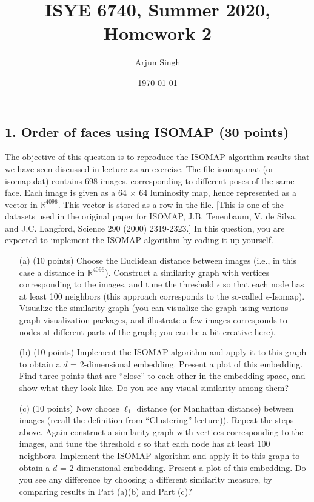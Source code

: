 \documentclass[twoside,12pt]{article}
\begin{document}
\title{ISYE 6740, Summer 2020, Homework 2}
\author{Arjun Singh}
\date{\today}
\maketitle



\subsection*{1. Order of faces using ISOMAP (30 points)}

The objective of this question is to reproduce the ISOMAP algorithm results that we have seen discussed in lecture as an exercise. The file \textsf{isomap.mat} (or \textsf{isomap.dat}) contains 698 images, corresponding to different poses of the same face. Each image is given as a 64 $\times$ 64 luminosity map, hence represented as a vector in $\mathbb R^{4096}$. This vector is stored as a row in the file. [This is one of the datasets used in the original paper for ISOMAP, J.B. Tenenbaum, V. de Silva, and J.C. Langford, Science 290 (2000) 2319-2323.] In this question, you are expected to implement the ISOMAP algorithm by coding it up yourself.

\begin{enumerate} 
\item[(a)] (10 points) Choose the Euclidean distance between images (i.e., in this case a distance in $\mathbb R^{4096}$). Construct a similarity graph with vertices corresponding to the images, and tune the threshold $\epsilon$ so that each node has at least 100 neighbors (this approach corresponds to the so-called $\epsilon$-Isomap). Visualize the similarity graph (you can visualize the graph  using various graph visualization packages, and illustrate a few images corresponds to nodes at different parts of the graph; you can be a bit creative here).
 
\item[(b)] (10 points) Implement the ISOMAP algorithm and apply it to this graph to obtain a $d$ = 2-dimensional embedding. Present a plot of this embedding. Find three points that are ``close'' to each other in the embedding space, and show what they look like. Do you see any visual similarity among them?

\item[(c)] (10 points) Now choose $\ell_1$ distance (or Manhattan distance) between images (recall the definition from ``Clustering'' lecture)). Repeat the steps above. Again construct a similarity graph with vertices corresponding to the images, and tune the threshold $\epsilon$ so that each node has at least 100 neighbors. Implement the ISOMAP algorithm and apply it to this graph to obtain a $d$ = 2-dimensional embedding. Present a plot of this embedding.  Do you see any difference by choosing a different similarity measure, by comparing results in Part (a)(b) and Part (c)? 

\end{enumerate}
\end{document}
